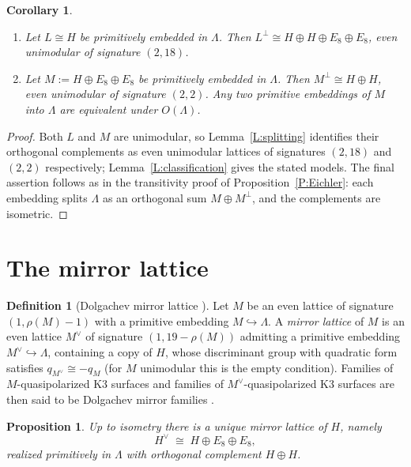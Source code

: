 \documentclass[11pt]{amsart}
\theoremstyle{plain}
\newtheorem{proposition}[theorem]{Proposition}
\newtheorem{corollary}[theorem]{Corollary}
\theoremstyle{definition}
\newtheorem{definition}[theorem]{Definition}
\theoremstyle{remark}
\numberwithin{equation}{section}
\begin{document}
\begin{corollary}\label{C:standard}
\begin{enumerate}
\item Let \(L\cong H\) be primitively embedded in \(\Lambda\). Then
\(L^{\perp}\cong H\oplus H\oplus E_{8}\oplus E_{8}\), even unimodular of
signature \((2,18)\).
\item Let \(M:=H\oplus E_{8}\oplus E_{8}\) be primitively embedded in
\(\Lambda\). Then \(M^{\perp}\cong H\oplus H\), even unimodular of
signature \((2,2)\). Any two primitive embeddings of \(M\) into \(\Lambda\)
are equivalent under \(O(\Lambda)\).
\end{enumerate}
\end{corollary}

\begin{proof}
Both \(L\) and \(M\) are unimodular, so Lemma~\ref{L:splitting} identifies
their orthogonal complements as even unimodular lattices of signatures
\((2,18)\) and \((2,2)\) respectively; Lemma~\ref{L:classification} gives the
stated models. The final assertion follows as in the transitivity proof of
Proposition~\ref{P:Eichler}: each embedding splits \(\Lambda\) as an
orthogonal sum \(M\oplus M^{\perp}\), and the complements are isometric.
\end{proof}

\section{The mirror lattice}\label{S:mirror-lattice}

\begin{definition}[Dolgachev mirror lattice \cite{dolgachevmirror}]
\label{D:mirror-lattice}
Let \(M\) be an even lattice of signature \((1,\rho(M)-1)\) with a primitive
embedding \(M\hookrightarrow\Lambda\). A {\em mirror lattice} of \(M\) is an
even lattice \(M^{\vee}\) of signature \((1,19-\rho(M))\) admitting a
primitive embedding \(M^{\vee}\hookrightarrow\Lambda\), containing a copy of
\(H\), whose discriminant group with quadratic form satisfies
\(q_{M^{\vee}}\cong -q_{M}\) (for \(M\) unimodular this is the empty
condition). Families of \(M\)-quasipolarized K3 surfaces and families of
\(M^{\vee}\)-quasipolarized K3 surfaces are then said to be Dolgachev
mirror families \cite{dolgachevmirror}.
\end{definition}

\begin{proposition}\label{P:mirror-of-H}
Up to isometry there is a unique mirror lattice of \(H\), namely
\[
H^{\vee}\;\cong\;H\oplus E_{8}\oplus E_{8},
\]
realized primitively in \(\Lambda\) with orthogonal complement
\(H\oplus H\).
\end{proposition}
\end{document}
